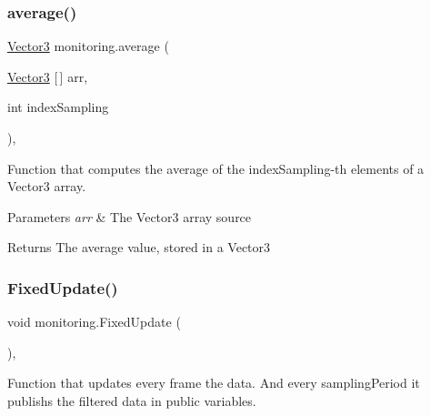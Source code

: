 \subsubsection{\texorpdfstring{average()}{average()}\hspace{0.1cm}{\footnotesize\ttfamily [2/2]}}
{\footnotesize\ttfamily \hyperlink{classmonitoring_a4a225f8529921b2f6b38156cf3b296cf}{Vector3} monitoring.\+average (\begin{DoxyParamCaption}\item[{\hyperlink{classmonitoring_a4a225f8529921b2f6b38156cf3b296cf}{Vector3} \mbox{[}$\,$\mbox{]}}]{arr,  }\item[{int}]{index\+Sampling }\end{DoxyParamCaption})\hspace{0.3cm}{\ttfamily [inline]}, {\ttfamily [private]}}



Function that computes the average of the {\ttfamily index\+Sampling}-\/th elements of a {\ttfamily Vector3} array. 


\begin{DoxyParams}{Parameters}
{\em arr} & The Vector3 array source\\
\hline
\end{DoxyParams}
\begin{DoxyReturn}{Returns}
The average value, stored in a {\ttfamily Vector3}
\end{DoxyReturn}
\mbox{\label{classmonitoring_a257af7f7bd0d01b91dc5d34f85743b5f}} 
\subsubsection{\texorpdfstring{Fixed\+Update()}{FixedUpdate()}}
{\footnotesize\ttfamily void monitoring.\+Fixed\+Update (\begin{DoxyParamCaption}{ }\end{DoxyParamCaption})\hspace{0.3cm}{\ttfamily [inline]}, {\ttfamily [private]}}



Function that updates every frame the data. And every \textquotesingle{}sampling\+Period\textquotesingle{} it publishs the filtered data in public variables. 

\mbox{\label{classmonitoring_a4aa220d0178d2b204e8039855c412c30}} 
